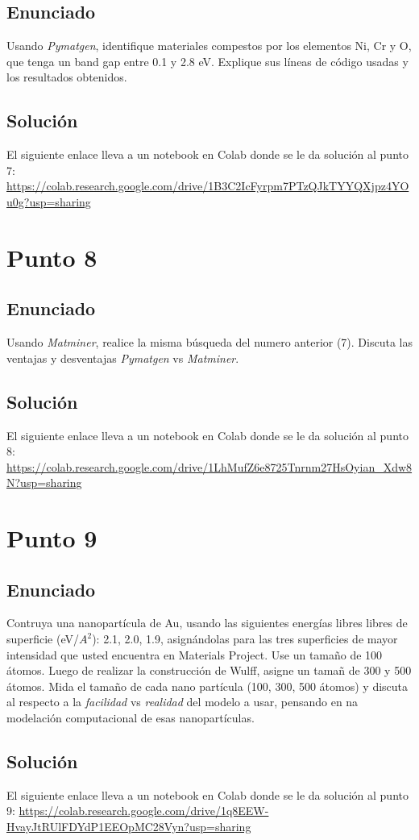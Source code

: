 \documentclass[a4paper,12pt]{article}
\begin{document}
\subsection*{Enunciado}
Usando \textit{Pymatgen}, identifique materiales compestos por los elementos Ni, Cr y O, que tenga un band gap entre 0.1 y 2.8 eV. Explique sus líneas de código usadas y los resultados obtenidos.
\subsection*{Solución}
El siguiente enlace lleva a un notebook en Colab donde se le da solución al punto 7: \url{https://colab.research.google.com/drive/1B3C2IcFyrpm7PTzQJkTYYQXjpz4YOu0g?usp=sharing}
\section{Punto 8}
\subsection*{Enunciado}
Usando \textit{Matminer}, realice la misma búsqueda del numero anterior (7). Discuta las ventajas y desventajas \textit{Pymatgen} vs \textit{Matminer}.
\subsection*{Solución}
El siguiente enlace lleva a un notebook en Colab donde se le da solución al punto 8: \url{https://colab.research.google.com/drive/1LhMufZ6e8725Tnrnm27HsOyian_Xdw8N?usp=sharing}
\section{Punto 9}
\subsection*{Enunciado}
Contruya una nanopartícula de Au, usando las siguientes energías libres libres de superficie (eV/$A^2$): 2.1, 2.0, 1.9, asignándolas para las tres superficies de mayor intensidad que usted encuentra en Materials Project. Use un tamaño de 100 átomos. Luego de realizar la construcción de Wulff, asigne un tamañ de 300 y 500 átomos. Mida el tamaño de cada nano partícula (100, 300, 500 átomos) y discuta al respecto a la \textit{facilidad} vs \textit{realidad} del modelo a usar, pensando en na modelación computacional de esas nanopartículas.
\subsection*{Solución}
El siguiente enlace lleva a un notebook en Colab donde se le da solución al punto 9: \url{https://colab.research.google.com/drive/1q8EEW-HvayJtRUlFDYdP1EEOpMC28Vyn?usp=sharing}
\end{document}
